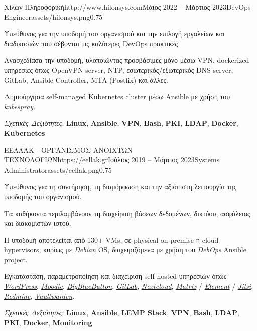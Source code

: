 \documentclass{mycv}
\begin{document}
	\begin{EntryDatedLogo}{Χίλων Πληροφορική}{http://www.hilonsys.com}{Μάιος 2022 -- Μάρτιος 2023}{DevOps Engineer}{assets/hilonsys.png}{0.75}
		\begin{Itemize}
			\item Υπεύθυνος για την υποδομή του οργανισμού και την επιλογή εργαλείων και διαδικασιών που σέβονται τις καλύτερες DevOps πρακτικές.
			\item Ανασχεδίασα την υποδομή, υλοποιώντας προσβάσιμες μόνο μέσω VPN, dockerized υπηρεσίες όπως OpenVPN server, NTP, εσωτερικός/εξωτερικός DNS server, GitLab, Ansible Controller, MTA (Postfix) και άλλες.
			\item Δημιούργησα self-managed Kubernetes cluster μέσω Ansible με χρήση του \href{https://kubespray.io/}{\textit{kubespray}}.
			\item \textit{Σχετικές Δεξιότητες}: \textbf{Linux}, \textbf{Ansible}, \textbf{VPN}, \textbf{Bash}, \textbf{PKI}, \textbf{LDAP}, \textbf{Docker}, \textbf{Kubernetes}
		\end{Itemize}
	\end{EntryDatedLogo}

	\vspace{0.5cm}

	\begin{EntryDatedLogo}{ΕΕΛΛΑΚ - ΟΡΓΑΝΙΣΜΟΣ ΑΝΟΙΧΤΩΝ ΤΕΧΝΟΛΟΓΙΩΝ}{https://eellak.gr}{Ιούλιος 2019 -- Μάρτιος 2023}{Systems Administrator}{assets/eellak.png}{0.75}
		\begin{Itemize}
			\item Υπεύθυνος για τη συντήρηση, τη διαμόρφωση και την αξιόπιστη λειτουργία της υποδομής του οργανισμού.
			\item Τα καθήκοντα περιλαμβάνουν τη διαχείριση βάσεων δεδομένων, δικτύου, ασφάλειας και διακομιστών ιστού.
			\item Η υποδομή αποτελείται από 130+ VMs, σε physical on-premise ή cloud hypervisors, κυρίως με \href{https://www.debian.org}{\textit{Debian}} OS, διαχειριζόμενα με χρήση του \href{https://debops.org}{\textit{DebOps}} Ansible project.
			\item Εγκατάσταση, παραμετροποίηση και διαχείριση self-hosted υπηρεσιών όπως \href{https://wordpress.com}{\textit{WordPress}}, \href{https://moodle.org}{\textit{Moodle}}, \href{https://bigbluebutton.org}{\textit{BigBlueButton}}, \href{https://about.gitlab.com/install/}{\textit{GitLab}}, \href{https://nextcloud.com}{\textit{Nextcloud}}, \href{https://matrix.org}{\textit{Matrix}} / \href{https://element.io}{\textit{Element}} / \href{https://jitsi.org}{\textit{Jitsi}}, \href{https://www.redmine.org/}{\textit{Redmine}}, \href{https://vaultwarden.discourse.group/}{\textit{Vaultwarden}}.
			\item \textit{Σχετικές Δεξιότητες}: \textbf{Linux}, \textbf{Ansible}, \textbf{LEMP Stack}, \textbf{VPN}, \textbf{Bash}, \textbf{LDAP}, \textbf{PKI}, \textbf{Docker}, \textbf{Monitoring}
		\end{Itemize}
	\end{EntryDatedLogo}
\end{document}
